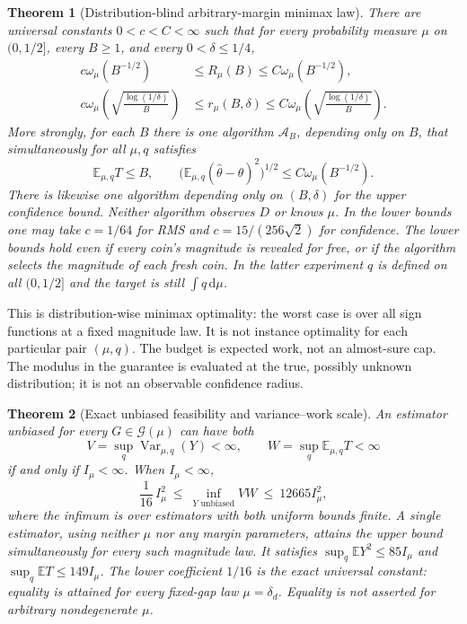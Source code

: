 \documentclass[11pt,a4paper]{article}
\newtheorem{theorem}{Theorem}
\theoremstyle{definition}
\newcommand{\E}{\mathbb E}
\newcommand{\Var}{\operatorname{Var}}
\newcommand{\cG}{\mathcal G}
\newcommand{\cA}{\mathcal A}
\newcommand{\om}{\omega_\mu}
\newcommand{\Iinv}{I_\mu}
\begin{document}
\begin{theorem}[Distribution-blind arbitrary-margin minimax law]\label{thm:main}
There are universal constants $0<c<C<\infty$ such that for every probability
measure $\mu$ on $(0,1/2]$, every $B\ge1$, and every $0<\delta\le1/4$,
\begin{align}
 c\om(B^{-1/2})&\le R_\mu(B)\le C\om(B^{-1/2}),\label{eq:main-rms}\\
 c\om\!\left(\sqrt{\frac{\log(1/\delta)}{B}}\right)
 &\le r_\mu(B,\delta)
 \le C\om\!\left(\sqrt{\frac{\log(1/\delta)}{B}}\right).
 \label{eq:main-conf}
\end{align}
More strongly, for each $B$ there is one algorithm $\cA_B$, depending only
on $B$, that simultaneously for all $\mu,q$ satisfies
\begin{equation}\label{eq:blind-guarantee}
 \E_{\mu,q}T\le B,\qquad
 \bigl(\E_{\mu,q}(\widehat\theta-\theta)^2\bigr)^{1/2}
 \le C\om(B^{-1/2}).
\end{equation}
There is likewise one algorithm depending only on $(B,\delta)$ for the
upper confidence bound. Neither algorithm observes $D$ or knows $\mu$.
In the lower bounds one may take $c=1/64$ for RMS and
$c=15/(256\sqrt2)$ for confidence.
The lower bounds hold even if every coin's magnitude is revealed for free,
or if the algorithm selects the magnitude of each fresh coin. In the latter
experiment $q$ is defined on all $(0,1/2]$ and the target is still
$\int q\,\mathrm d\mu$.
\end{theorem}

This is distribution-wise minimax optimality: the worst case is over all
sign functions at a fixed magnitude law. It is not instance optimality
for each particular pair $(\mu,q)$. The budget is expected work, not an
almost-sure cap. The modulus in the guarantee is evaluated at the true,
possibly unknown distribution; it is not an observable confidence radius.

\begin{theorem}[Exact unbiased feasibility and variance--work scale]
\label{thm:unbiased}
An estimator unbiased for every $G\in\cG(\mu)$ can have both
\[
 V=\sup_q\Var_{\mu,q}(Y)<\infty,\qquad
 W=\sup_q\E_{\mu,q}T<\infty
\]
if and only if $\Iinv<\infty$. When $\Iinv<\infty$,
\begin{equation}\label{eq:product}
 \frac1{16}\,\Iinv^2
 \ \le\ \inf_{Y\text{ unbiased}} VW
 \ \le\ 12665\Iinv^2,
\end{equation}
where the infimum is over estimators with both uniform bounds finite.
A single estimator, using neither $\mu$ nor any margin parameters, attains
the upper bound simultaneously for every such magnitude law. It satisfies
$\sup_q\E Y^2\le85\Iinv$ and $\sup_q\E T\le149\Iinv$.
The lower coefficient $1/16$ is the exact universal constant: equality is
attained for every fixed-gap law $\mu=\delta_d$. Equality is not asserted
for arbitrary nondegenerate $\mu$.
\end{theorem}
\end{document}
